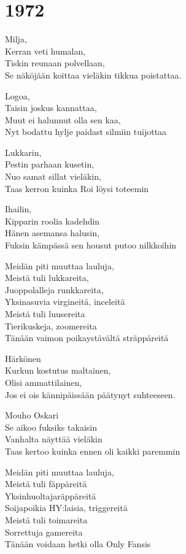 \section{1972}
Milja,\\
Kerran veti humalan,\\
Tiskin reunaan polvellaan,\\
Se näköjään koittaa vieläkin tikkua poistattaa.

Logoa,\\
Taisin joskus kannattaa,\\
Muut ei halunnut olla sen kaa,\\
Nyt bodattu hylje paidast silmiin tuijottaa

Lukkarin,\\
Pestin parhaan kusetin,\\
Nuo samat sillat vieläkin,\\
Taas kerron kuinka Roi löysi toteemin

Ihailin,\\
Kipparin roolia kadehdin\\
Hänen asemansa halusin,\\
Fuksin kämpässä sen housut putoo nilkkoihin

Meidän piti muuttaa lauluja,\\
Meistä tuli lukkareita,\\
Juoppolalleja runkkareita,\\
Yksinasuvia virgineitä, inceleitä\\
Meistä tuli luusereita\\
Tierikuskeja, zoomereita\\
Tänään vaimon poikaystävältä sträppäreitä

Härkönen\\
Kurkun kostutus maltainen,\\
Olisi ammattilainen,\\
Jos ei ois kännipäissään päätynyt suhteeseen.

Mouho Oskari\\
Se aikoo fuksiks takaisin\\
Vanhalta näyttää vieläkin\\
Taas kertoo kuinka ennen oli kaikki paremmin

Meidän piti muuttaa lauluja,\\
Meistä tuli fäppäreitä\\
Yksinhuoltajaräppäreitä\\
Soijapoikia HY:laisia, triggereitä\\
Meistä tuli toimareita\\
Sorrettuja gamereita\\
Tänään voidaan hetki olla Only Fansis

